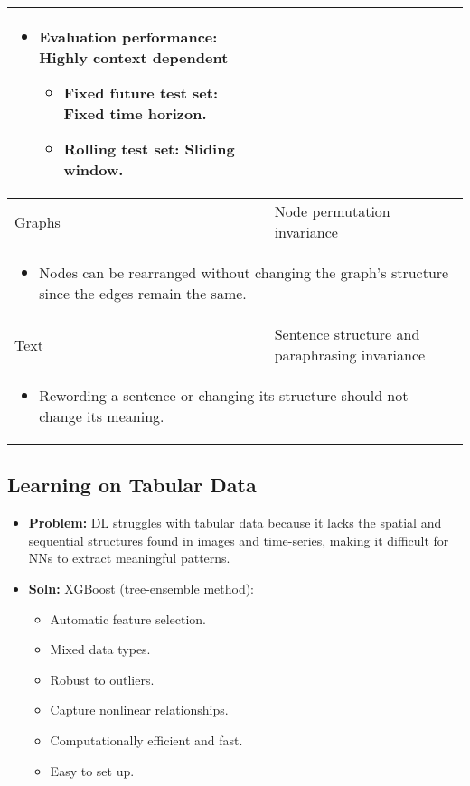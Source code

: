 \begin{summary}
\begin{center}
\begin{tabular}{ll}
{\begin{itemize}
                \item \textbf{Evaluation performance:} Highly context dependent
                \begin{itemize}
                    \item Fixed future test set: Fixed time horizon.
                    \item Rolling test set: Sliding window.
                \end{itemize}
            \end{itemize}} \\
            \midrule
            Graphs & Node permutation invariance \\
            \multicolumn{2}{p{\linewidth}}{
            \begin{itemize}
                \item Nodes can be rearranged without changing the graph's structure since the edges remain the same.
            \end{itemize}} \\
            \midrule
            Text & Sentence structure and paraphrasing invariance \\
            \multicolumn{2}{p{\linewidth}}{
            \begin{itemize}
                \item Rewording a sentence or changing its structure should not change its meaning.
            \end{itemize}} \\
            \bottomrule
        \end{tabular}
    \end{center}
\end{summary}
\newpage

\subsection{Learning on Tabular Data}
\begin{notes}
    \begin{itemize}
        \item \textbf{Problem:} DL struggles with tabular data because it lacks the spatial and sequential structures found in images and time-series, making it difficult for NNs to extract meaningful patterns. 
        \item \textbf{Soln:} XGBoost (tree-ensemble method):
        \begin{itemize}
            \item Automatic feature selection.
            \item Mixed data types.
            \item Robust to outliers.
            \item Capture nonlinear relationships.
            \item Computationally efficient and fast.
            \item Easy to set up.
        \end{itemize}
    \end{itemize}
\end{notes} 

